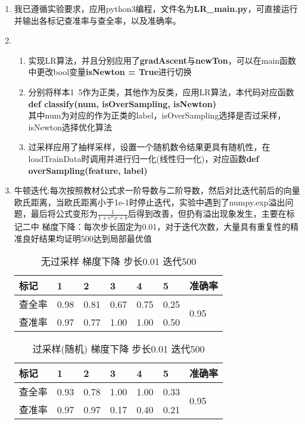 \documentclass[a4paper,UTF8]{article}
\numberwithin{equation}{section}
\begin{document}
\begin{enumerate}[(1)]
	\item 我已遵循实验要求，应用python3编程，文件名为\textbf{\color{blue}LR\_main.py}，可直接运行并输出各标记查准率与查全率，以及准确率。
	\item 
	\begin{enumerate}
		\item 实现LR算法，并且分别应用了\textbf{\color{blue}gradAscent}与\textbf{\color{blue}newTon}，可以在main函数中更改bool变量\textbf{\color{blue}isNewton = True}进行切换
		\item 分别将样本1~5作为正类，其他作为反类，应用LR算法，本代码对应函数\\
		\textbf{\color{blue}def classify(num, isOverSampling, isNewton)}\\
		其中num为对应的作为正类的label，isOverSampling选择是否过采样，isNewton选择优化算法
		\item 过采样应用了抽样采样，设置一个随机数令结果更具有随机性，在loadTrainData时调用并进行归一化(线性归一化)，对应函数\textbf{\color{blue}def overSampling(feature, label)}
	\end{enumerate}
	\item 
		牛顿迭代:每次按照教材公式求一阶导数与二阶导数，然后对比迭代前后的向量欧氏距离，当欧氏距离小于1e-1时停止迭代，实验中遇到了numpy.exp溢出问题，最后将公式变形为$\frac{1}{1+e^wx+b}$后得到改善，但扔有溢出现象发生，主要在标记二中
		梯度下降：每次步长固定为0.01，对于迭代次数，大量具有重复性的精准良好结果均证明500达到局部最优值
	\begin{table}[!h]
		\centering
		\caption{无过采样 梯度下降 步长0.01 迭代500}
		\label{}
		\begin{tabular}{l|llllll}
			\hline
			标记  & 1    & 2    & 3    & 4    & 5    & 准确率                   \\ \hline
			查全率 & 0.98 & 0.81 & 0.67 & 0.75 & 0.25 & \multirow{2}{*}{0.95} \\ \cline{1-1}
			查准率 & 0.97 & 0.77 & 1.00 & 1.00 & 0.50 &                       \\ \hline
		\end{tabular}
	\end{table}

	\begin{table}[!h]
		\centering
		\caption{过采样(随机) 梯度下降 步长0.01 迭代500}
		\label{}
		\begin{tabular}{l|llllll}
			\hline
			标记  & 1    & 2    & 3    & 4    & 5    & 准确率                   \\ \hline
			查全率 & 0.93 & 0.78 & 1.00 & 1.00 & 0.33 & \multirow{2}{*}{0.95} \\ \cline{1-1}
			查准率 & 0.97 & 0.97 & 0.17 & 0.40 & 0.21 &                       \\ \hline
		\end{tabular}
	\end{table}


\end{enumerate}
\end{document}
